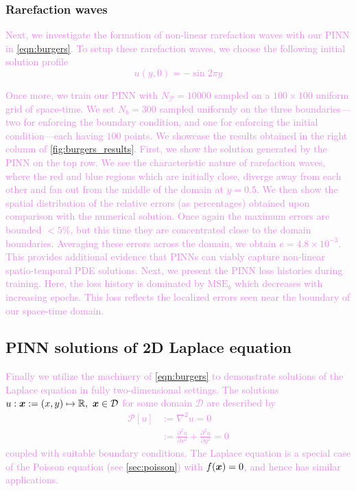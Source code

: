 \documentclass[11pt]{article}
\newcommand{\gv}[1]{\ensuremath{\mbox{\boldmath$ #1 $}}}
\newcommand{\mse}{\textrm{MSE}}
\newcommand{\pde}{\ensuremath{\mathcal{P}}}
\newcommand{\newcontent}[1]{\textcolor{violet}{#1}}
\begin{document}
\subsubsection{Rarefaction waves}
\label{sec:org032a3f1}
\newcontent{
Next, we investigate the formation of non-linear rarefaction waves with our PINN in
\cref{eqn:burgers}. To setup these rarefaction waves, we choose the following
initial solution profile
\[ u(y, 0) = -\sin{2 \pi y}\]
}

\newcontent{
Once more, we train our PINN with \(N_\pde = 10000\) sampled on a \(100 \times 100\) uniform
grid of space-time. We set \(N_b = 300\) sampled uniformly on
the three boundaries---two for enforcing the boundary condition, and one for
enforcing the initial condition---each having \(100\) points. We showcase
the results obtained
in the right column of \cref{fig:burgers_results}. First, we show the
solution generated by the PINN on the top row. We see the
characteristic nature of rarefaction waves, where the red and blue regions
which are initially close, diverge away from each other and fan out
from the middle of the domain at \(y = 0.5\). We then show the spatial
distribution of the relative errors (as percentages) obtained upon
comparison with the numerical solution. Once again the maximum errors are
bounded \(< 5\%\), but this time they are concentrated close to
the domain boundaries. Averaging these errors across the domain, we obtain \(e = 4.8 \times 10^{-3}\).
This provides additional evidence that PINNs can viably capture non-linear
spatio-temporal PDE solutions. Next, we present the PINN loss histories
during training.
Here, the loss history is dominated by \(\mse_{b}\) which decreases with
increasing epochs. This loss reflects the localized errors seen near the
boundary of our space-time domain.
}

\subsection{PINN solutions of 2D Laplace equation}
\label{sec:laplace}
\newcontent{
Finally we utilize the machinery of \cref{eqn:burgers} to demonstrate solutions
of the Laplace equation in fully two-dimensional settings. The solutions \(u : \gv{x} := (x, y) \mapsto \mathbb{R},~\gv{x} \in \mathcal{D}\) for some domain \(\mathcal{D}\)
are described by
\begin{equation}
\label{eqn:laplace}
\begin{aligned}
	\pde[ u ] &:= \nabla^2 u = 0 \\
	   		  &:= \frac{\partial^2 u}{\partial x^2} + \frac{\partial^2 u}{\partial y^2} = 0
\end{aligned}
\end{equation}
coupled with suitable boundary conditions. The Laplace equation is a special
case of the Poisson equation (see \cref{sec:poisson}) with \(f(\gv{x}) = 0\),
and hence has similar applications.
}
\end{document}
